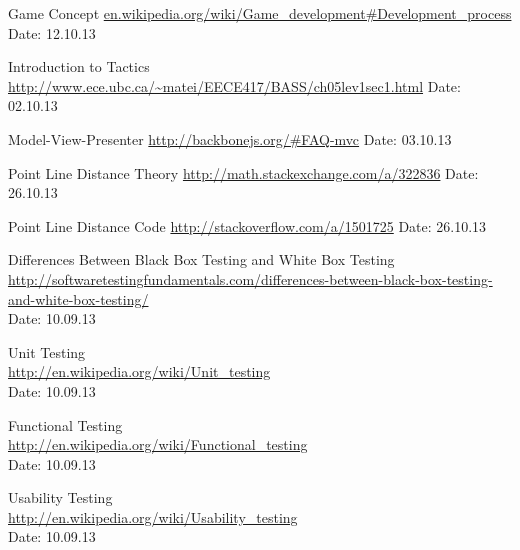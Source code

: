\begin{thebibliography}{99}
	Game Concept\newline
	\href {en.wikipedia.org/wiki/Game\_development#Development\_process}{en.wikipedia.org/wiki/Game\_development\#Development\_process}\newline
	Date: 12.10.13

	Introduction to Tactics \newline
	\url {http://www.ece.ubc.ca/~matei/EECE417/BASS/ch05lev1sec1.html} \newline
	Date: 02.10.13

	Model-View-Presenter\newline
	\href {http://backbonejs.org/\#FAQ-mvc}{http://backbonejs.org/\#FAQ-mvc}\newline
	Date: 03.10.13

	Point Line Distance Theory\newline
	\href {http://math.stackexchange.com/a/322836}{http://math.stackexchange.com/a/322836}\newline
	Date: 26.10.13

	Point Line Distance Code\newline
	\href {http://stackoverflow.com/a/1501725}{http://stackoverflow.com/a/1501725}\newline
	Date: 26.10.13

	Differences Between Black Box Testing and White Box Testing \\
	\href {http://softwaretestingfundamentals.com/differences-between-black-box-testing-and-white-box-testing/}{http://softwaretestingfundamentals.com/differences-between-black-box-testing-and-white-box-testing/} \\
	Date: 10.09.13

	Unit Testing \\
	\href {http://en.wikipedia.org/wiki/Unit_testing}{http://en.wikipedia.org/wiki/Unit\_testing} \\
	Date: 10.09.13

	Functional Testing \\
	\href {http://en.wikipedia.org/wiki/Functional_testing}{http://en.wikipedia.org/wiki/Functional\_testing} \\
	Date: 10.09.13

	Usability Testing \\
	\href {http://en.wikipedia.org/wiki/Usability_testing}{http://en.wikipedia.org/wiki/Usability\_testing} \\
	Date: 10.09.13


\end{thebibliography}
